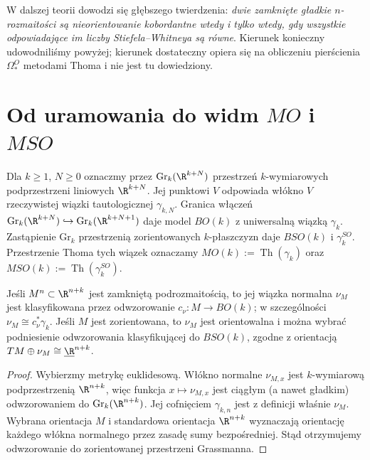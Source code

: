 \begin{uwaga}
W dalszej teorii dowodzi się głębszego twierdzenia:
\emph{dwie zamknięte gładkie $n$-rozmaitości są
nieorientowanie kobordantne wtedy i tylko wtedy, gdy
wszystkie odpowiadające im liczby Stiefela--Whitneya
są równe}. Kierunek konieczny udowodniliśmy powyżej;
kierunek dostateczny opiera się na obliczeniu pierścienia
$\Omega_*^O$ metodami Thoma i nie jest tu dowiedziony.
\end{uwaga}

\section{Od uramowania do widm \texorpdfstring{$MO$ i $MSO$}{MO i MSO}}
\begin{definicja}
Dla $k\ge1$, $N\ge0$ oznaczmy przez
$\mathrm{Gr}_k(\R^{k+N})$ przestrzeń $k$-wymiarowych
podprzestrzeni liniowych $\R^{k+N}$. Jej punktowi $V$
odpowiada włókno $V$ rzeczywistej wiązki tautologicznej
$\gamma_{k,N}$. Granica włączeń
$\mathrm{Gr}_k(\R^{k+N})\hookrightarrow
\mathrm{Gr}_k(\R^{k+N+1})$ daje model $BO(k)$
z uniwersalną wiązką $\gamma_k$. Zastąpienie
$\mathrm{Gr}_k$ przestrzenią zorientowanych
$k$-płaszczyzn daje $BSO(k)$ i $\gamma_k^{SO}$.
Przestrzenie Thoma tych wiązek oznaczamy
$MO(k):=\operatorname{Th}(\gamma_k)$ oraz
$MSO(k):=\operatorname{Th}(\gamma_k^{SO})$.
\end{definicja}

\begin{stwierdzenie}
\label{prop:normal-class-v9}
Jeśli $M^n\subset\R^{n+k}$ jest zamkniętą
podrozmaitością, to jej wiązka normalna
$\nu_M$ jest klasyfikowana przez odwzorowanie
$c_\nu:M\to BO(k)$; w szczególności
$\nu_M\cong c_\nu^*\gamma_k$.
Jeśli $M$ jest zorientowana, to $\nu_M$ jest
orientowalna i można wybrać podniesienie odwzorowania
klasyfikującej do $BSO(k)$, zgodne z orientacją
$TM\oplus\nu_M\cong\underline\R^{n+k}$.
\end{stwierdzenie}
\begin{proof}
Wybierzmy metrykę euklidesową. Włókno normalne
$\nu_{M,x}$ jest $k$-wymiarową podprzestrzenią
$\R^{n+k}$, więc funkcja $x\mapsto\nu_{M,x}$
jest ciągłym (a nawet gładkim) odwzorowaniem do
$\mathrm{Gr}_k(\R^{n+k})$. Jej cofnięciem
$\gamma_{k,n}$ jest z definicji właśnie $\nu_M$.
Wybrana orientacja $M$ i standardowa orientacja
$\R^{n+k}$ wyznaczają orientację każdego włókna
normalnego przez zasadę sumy bezpośredniej.
Stąd otrzymujemy odwzorowanie do zorientowanej
przestrzeni Grassmanna.
\end{proof}


